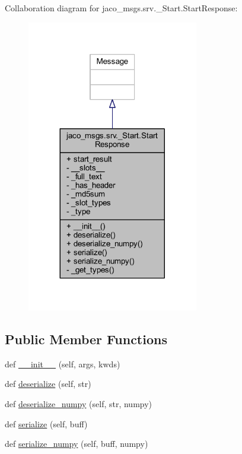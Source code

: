 Collaboration diagram for jaco\+\_\+msgs.\+srv.\+\_\+\+Start.\+Start\+Response\+:
\nopagebreak
\begin{figure}[H]
\begin{center}
\leavevmode
\includegraphics[width=212pt]{d7/d4e/classjaco__msgs_1_1srv_1_1__Start_1_1StartResponse__coll__graph}
\end{center}
\end{figure}
\subsection*{Public Member Functions}
\begin{DoxyCompactItemize}
\item 
def \hyperlink{classjaco__msgs_1_1srv_1_1__Start_1_1StartResponse_a3ff1992ef161244049f36c679d99f9b5}{\+\_\+\+\_\+init\+\_\+\+\_\+} (self, args, kwds)
\item 
def \hyperlink{classjaco__msgs_1_1srv_1_1__Start_1_1StartResponse_a369dc84bee9ee72470bf7b43597f77f5}{deserialize} (self, str)
\item 
def \hyperlink{classjaco__msgs_1_1srv_1_1__Start_1_1StartResponse_aae41af51b48623df992a4b7e56d62599}{deserialize\+\_\+numpy} (self, str, numpy)
\item 
def \hyperlink{classjaco__msgs_1_1srv_1_1__Start_1_1StartResponse_adfd7f9caa36e7f5f5a103bd700b01158}{serialize} (self, buff)
\item 
def \hyperlink{classjaco__msgs_1_1srv_1_1__Start_1_1StartResponse_af75b93d9250dbdcf066b5756a80a4bd1}{serialize\+\_\+numpy} (self, buff, numpy)
\end{DoxyCompactItemize}
